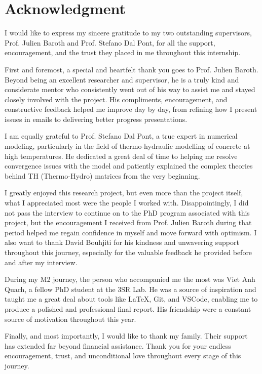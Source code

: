 \chapter*{Acknowledgment}

I would like to express my sincere gratitude to my two outstanding supervisors, Prof. Julien Baroth and Prof. Stefano Dal Pont, for all the support, encouragement, and the trust they placed in me throughout this internship.

First and foremost, a special and heartfelt thank you goes to Prof. Julien Baroth. Beyond being an excellent researcher and supervisor, he is a truly kind and considerate mentor who consistently went out of his way to assist me and stayed closely involved with the project. His compliments, encouragement, and constructive feedback helped me improve day by day, from refining how I present issues in emails to delivering better progress presentations.

I am equally grateful to Prof. Stefano Dal Pont, a true expert in numerical modeling, particularly in the field of thermo-hydraulic modelling of concrete at high temperatures. He dedicated a great deal of time to helping me resolve convergence issues with the model and patiently explained the complex theories behind TH (Thermo-Hydro) matrices from the very beginning.

I greatly enjoyed this research project, but even more than the project itself, what I appreciated most were the people I worked with. Disappointingly, I did not pass the interview to continue on to the PhD program associated with this project, but the encouragement I received from Prof. Julien Baroth during that period helped me regain confidence in myself and move forward with optimism. I also want to thank David Bouhjiti for his kindness and unwavering support throughout this journey, especially for the valuable feedback he provided before and after my interview.

During my M2 journey, the person who accompanied me the most was Viet Anh Quach, a fellow PhD student at the 3SR Lab. He was a source of inspiration and taught me a great deal about tools like LaTeX, Git, and VSCode, enabling me to produce a polished and professional final report. His friendship were a constant source of motivation throughout this year.

Finally, and most importantly, I would like to thank my family. Their support has extended far beyond financial assistance. Thank you for your endless encouragement, trust, and unconditional love throughout every stage of this journey.